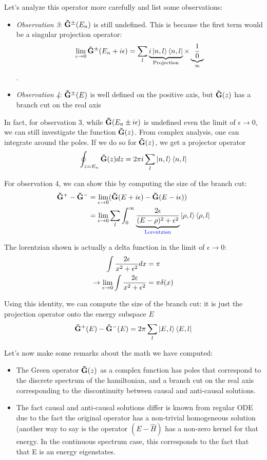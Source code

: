 \documentclass[11pt]{article}
\theoremstyle{definition}
\begin{document}
Let's analyze this operator more carefully and list some observations:
\begin{itemize}
\item \emph{Observation 3}: $\mathbf{\tilde{G}}^\pm(E_n)$ is still undefined.  This is because the first term would be a singular projection operator:
$$\lim_{\epsilon \rightarrow 0}\mathbf{\tilde{G}}^\pm(E_n + i \epsilon) = \sum_l \underbrace{{i \ket{n, l} \bra{n, l}}}_{\text{Projection}} \times \underbrace{{1 \over 0}}_{\infty}$$.
\item \emph{Observation 4}: $\mathbf{\tilde{G}}^\pm(E)$ is well defined on the positive axis, but $\mathbf{\tilde{G}}(z)$ has a branch cut on the real axis
\end{itemize}

In fact, for observation 3, while $\mathbf{\tilde{G}}(E_n \pm i \epsilon)$ is undefined even the limit of $\epsilon \rightarrow 0$, we can still investigate the function $\mathbf{\tilde{G}}(z)$.  From complex analysis, one can integrate around the poles.  If we do so for $\mathbf{\tilde{G}}(z)$, we get a projector operator
$$\oint_{z = E_n} \mathbf{\tilde{G}}(z) {dz} =  2 \pi i \sum_{l} \ket{n, l} \bra{n, l}$$

For observation 4, we can show this by computing the size of the branch cut:
\begin{align}
\mathbf{\tilde{G}}^+ - \mathbf{\tilde{G}}^- &= \lim_{\epsilon \rightarrow 0} (\mathbf{\tilde{G}}(E + i \epsilon) - \mathbf{\tilde{G}}(E- i \epsilon)) \\
& = \lim_{\epsilon \rightarrow 0}\sum_l \int_0^\infty \underbrace{2 \epsilon \over (E - \rho)^2 + \epsilon^2}_{\text{\color{blue} Lorentzian}} \ket{\rho, l} \bra{\rho, l}
\end{align}

The lorentzian shown is actually a delta function in the limit of $\epsilon \rightarrow 0$:
\begin{align}
 \int {2 \epsilon \over x^2 + \epsilon^2} dx & = \pi \\
\rightarrow  \lim_{\epsilon \rightarrow 0} \int {2 \epsilon \over x^2 + \epsilon^2} &= \pi \delta(x)
\end{align}

Using this identity, we can compute the size of the branch cut: it is just the projection operator onto the energy subspace $E$
\begin{align}
\mathbf{\tilde{G}}^+(E) - \mathbf{\tilde{G}}^-(E) = 2 \pi \sum_l \ket{E, l} \bra{E, l} 
\end{align}

Let's now make some remarks about the math we have computed:
\begin{itemize}
\item The Green operator $\mathbf{\tilde{G}}(z)$ as a complex function has poles that correspond to the discrete spectrum of the hamiltonian, and a branch cut on the real axis corresponding to the discontinuity between causal and anti-causal solutions.
\item The fact causal and anti-causal solutions differ is known from regular ODE due to the fact the original operator has a non-trivial homogeneous solution (another way to say is the operator $(E - \hat{H})$ has a non-zero kernel for that energy.  In the continuous spectrum case, this corresponds to the fact that that E is an energy eigenstates.
\end{itemize}
\end{document}
